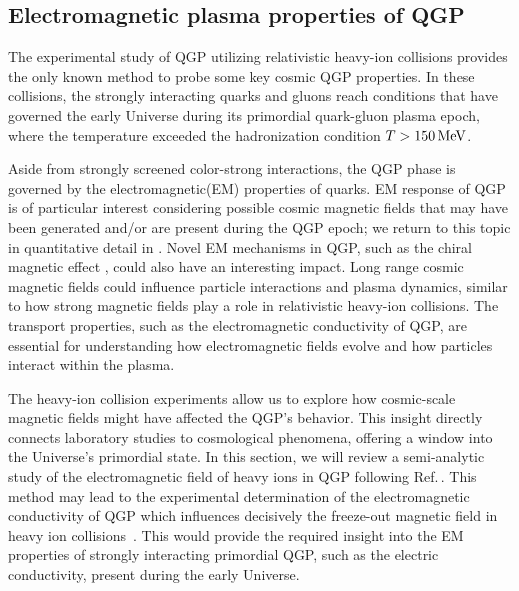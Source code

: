 \subsection{Electromagnetic plasma properties of QGP}\label{chap:QCD}
{\color{black} The experimental study of QGP utilizing relativistic heavy-ion collisions provides the only known method to probe some key cosmic QGP properties. In these collisions, the strongly interacting quarks and gluons reach conditions that have governed the early Universe during its primordial quark-gluon plasma epoch, where the temperature exceeded the hadronization condition $T>150\text{\,MeV}$.} 

{\color{black} Aside from strongly screened color-strong interactions, the QGP phase is governed by the electromagnetic(EM) properties of quarks. EM response of QGP is of particular interest considering possible cosmic magnetic fields that may have been generated and/or are present during the QGP epoch; we return to this topic in quantitative detail in . Novel EM mechanisms in QGP, such as the chiral magnetic effect \cite{Kharzeev:2007jp}, could also have an interesting impact. Long range cosmic magnetic fields could influence particle interactions and plasma dynamics, similar to how strong magnetic fields play a role in relativistic heavy-ion collisions. The transport properties, such as the electromagnetic conductivity of QGP, are essential for understanding how electromagnetic fields evolve and how particles interact within the plasma.}

{\color{black} The heavy-ion collision experiments allow us to explore how cosmic-scale magnetic fields might have affected the QGP's behavior. This insight directly connects laboratory studies to cosmological phenomena, offering a window into the Universe’s primordial state. In this section, we will review a semi-analytic study of the electromagnetic field of heavy ions in QGP following Ref.\,\cite{Grayson:2022asf}. This method may lead to the experimental determination of the electromagnetic conductivity of QGP which influences decisively the freeze-out magnetic field in heavy ion collisions~\cite{STAR:2023jdd}. This would provide the required insight into the EM properties of strongly interacting primordial QGP, such as the electric conductivity, present during the early Universe.}

